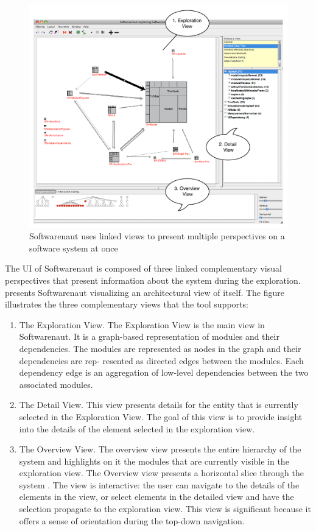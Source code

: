 \documentclass[preprint,12pt]{elsarticle}
\begin{document}
\begin{figure}[h]
\begin{center}
\includegraphics[width=0.8\linewidth]{images/SnautOnSnaut}
\caption{Softwarenaut uses linked views to present multiple perspectives on a software system at once}
\end{center}
\end{figure}

The UI of Softwarenaut is composed of three linked complementary visual perspectives that present information about the system during the exploration.  presents Softwarenaut visualizing an architectural view of itself. The figure illustrates the three complementary views that the tool supports:

\begin{enumerate}
\item The Exploration View. The Exploration View is the main view in Softwarenaut. It is a graph-based representation of modules and their dependencies. The modules are represented as nodes in the graph and their dependencies are rep- resented as directed edges between the modules. Each dependency edge is an aggregation of low-level dependencies between the two associated modules.
\item The Detail View. This view presents details for the entity that is currently selected in the Exploration View. The goal of this view is to provide insight into the details of the element selected in the exploration view.
\item The Overview View. The overview view presents the entire hierarchy of the system and highlights on it the modules that are currently visible in the exploration view. The Overview view presents a horizontal slice through the system \cite{wong-thesis}. The view is interactive: the user can navigate to the details of the elements in the view, or select elements in the detailed view and have the selection propagate to the exploration view. This view is significant because it offers a sense of orientation during the top-down navigation.
\end{enumerate}
\end{document}
